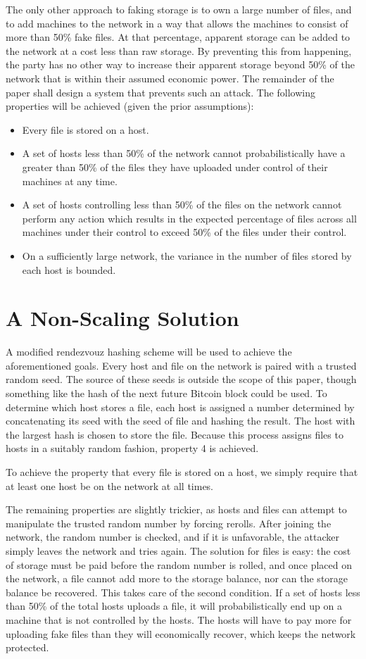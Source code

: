 \documentclass[twocolumn]{article}
\begin{document}
The only other approach to faking storage is to own a large number of files, and to add machines to the network in a way that allows the machines to consist of more than 50\% fake files.
At that percentage, apparent storage can be added to the network at a cost less than raw storage.
By preventing this from happening, the party has no other way to increase their apparent storage beyond 50\% of the network that is within their assumed economic power.
The remainder of the paper shall design a system that prevents such an attack. The following properties will be achieved (given the prior assumptions):
\begin{itemize}
	\item Every file is stored on a host.
	\item A set of hosts less than 50\% of the network cannot probabilistically have a greater than 50\% of the files they have uploaded under control of their machines at any time.
	\item A set of hosts controlling less than 50\% of the files on the network cannot perform any action which results in the expected percentage of files across all machines under their control to exceed 50\% of the files under their control.
	\item On a sufficiently large network, the variance in the number of files stored by each host is bounded.
\end{itemize}

\section{A Non-Scaling Solution}
A modified rendezvouz hashing scheme will be used to achieve the aforementioned goals.
Every host and file on the network is paired with a trusted random seed.
The source of these seeds is outside the scope of this paper, though something like the hash of the next future Bitcoin block could be used.
To determine which host stores a file, each host is assigned a number determined by concatenating its seed with the seed of file and hashing the result.
The host with the largest hash is chosen to store the file.
Because this process assigns files to hosts in a suitably random fashion, property 4 is achieved.

To achieve the property that every file is stored on a host, we simply require that at least one host be on the network at all times.

The remaining properties are slightly trickier, as hosts and files can attempt to manipulate the trusted random number by forcing rerolls.
After joining the network, the random number is checked, and if it is unfavorable, the attacker simply leaves the network and tries again.
The solution for files is easy: the cost of storage must be paid before the random number is rolled, and once placed on the network, a file cannot add more to the storage balance, nor can the storage balance be recovered.
This takes care of the second condition.
If a set of hosts less than 50\% of the total hosts uploads a file, it will probabilistically end up on a machine that is not controlled by the hosts.
The hosts will have to pay more for uploading fake files than they will economically recover, which keeps the network protected.
\end{document}
